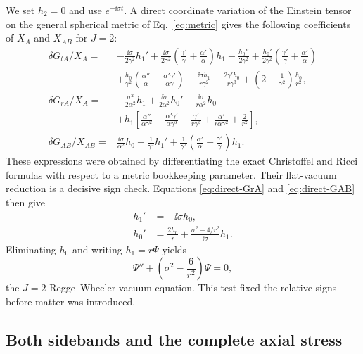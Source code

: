We set $h_2=0$ and use $e^{-\ii\sigma t}$.  A direct coordinate variation of
the Einstein tensor on the general spherical metric of Eq.~\eqref{eq:metric}
gives the following coefficients of $X_A$ and $X_{AB}$ for $J=2$:
\begin{align}
\delta G_{tA}/X_A={}&-\frac{\ii\sigma}{2\gamma^2}h_1'
+\frac{\ii\sigma}{2\gamma^2}
\left(\frac{\gamma'}{\gamma}+\frac{\alpha'}{\alpha}\right)h_1
-\frac{h_0''}{2\gamma^2}
+\frac{h_0'}{2\gamma^2}
\left(\frac{\gamma'}{\gamma}+\frac{\alpha'}{\alpha}\right)
\nonumber\\
&+\frac{h_0}{\gamma^2}
\left(\frac{\alpha''}{\alpha}-
\frac{\alpha'\gamma'}{\alpha\gamma}\right)
-\frac{\ii\sigma h_1}{r\gamma^2}
-\frac{2\gamma'h_0}{r\gamma^3}
+\left(2+\frac{1}{\gamma^2}\right)\frac{h_0}{r^2},
\label{eq:direct-GtA}\\
\delta G_{rA}/X_A={}&-\frac{\sigma^2}{2\alpha^2}h_1
+\frac{\ii\sigma}{2\alpha^2}h_0'
-\frac{\ii\sigma}{r\alpha^2}h_0
\nonumber\\
&+h_1\left[
\frac{\alpha''}{\alpha\gamma^2}
-\frac{\alpha'\gamma'}{\alpha\gamma^3}
-\frac{\gamma'}{r\gamma^3}
+\frac{\alpha'}{r\alpha\gamma^2}
+\frac{2}{r^2}\right],
\label{eq:direct-GrA}\\
\delta G_{AB}/X_{AB}={}&
\frac{\ii\sigma}{\alpha^2}h_0
+\frac{1}{\gamma^2}h_1'
+\frac{1}{\gamma^2}
\left(\frac{\alpha'}{\alpha}-\frac{\gamma'}{\gamma}\right)h_1.
\label{eq:direct-GAB}
\end{align}
These expressions were obtained by differentiating the exact Christoffel and
Ricci formulas with respect to a metric bookkeeping parameter.  Their
flat-vacuum reduction is a decisive sign check.  Equations
\eqref{eq:direct-GrA} and \eqref{eq:direct-GAB} then give
\begin{align}
h_1'&=-\ii\sigma h_0,\nonumber\\
h_0'&=\frac{2h_0}{r}+
\frac{\sigma^2-4/r^2}{\ii\sigma}h_1.
\label{eq:flat-axial-pair}
\end{align}
Eliminating $h_0$ and writing $h_1=r\Psi$ yields
\begin{equation}
\Psi''+\left(\sigma^2-\frac{6}{r^2}\right)\Psi=0,
\label{eq:flat-rw-control}
\end{equation}
the $J=2$ Regge--Wheeler vacuum equation.  This test fixed the relative signs
before matter was introduced.

\subsection{Both sidebands and the complete axial stress}

